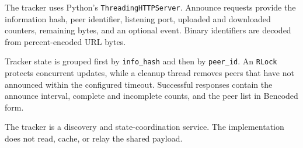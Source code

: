 The tracker uses Python's \texttt{ThreadingHTTPServer}. Announce requests provide the information hash, peer identifier, listening port, uploaded and downloaded counters, remaining bytes, and an optional event. Binary identifiers are decoded from percent-encoded URL bytes.

Tracker state is grouped first by \texttt{info\_hash} and then by \texttt{peer\_id}. An \texttt{RLock} protects concurrent updates, while a cleanup thread removes peers that have not announced within the configured timeout. Successful responses contain the announce interval, complete and incomplete counts, and the peer list in Bencoded form.

\begin{importantnote}
The tracker is a discovery and state-coordination service. The implementation does not read, cache, or relay the shared payload.
\end{importantnote}

